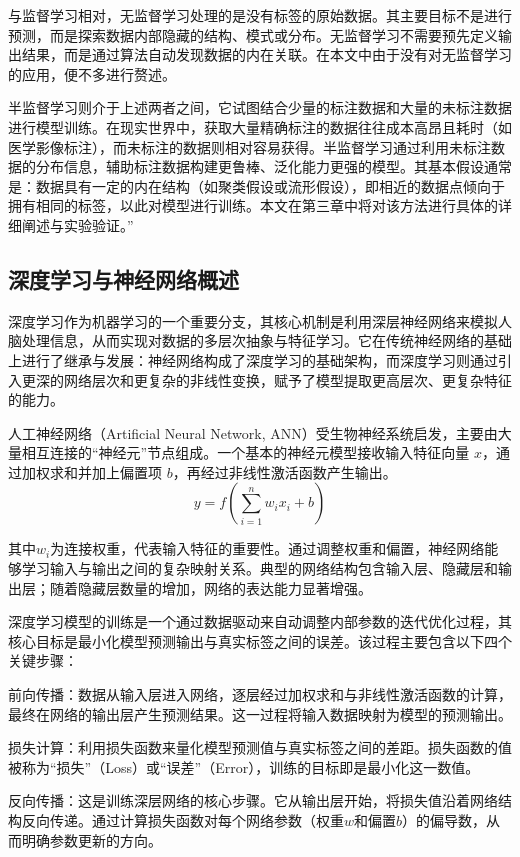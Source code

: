 \documentclass{xduugthesis}
\begin{document}
与监督学习相对，无监督学习处理的是没有标签的原始数据。其主要目标不是进行预测，而是探索数据内部隐藏的结构、模式或分布。无监督学习不需要预先定义输出结果，而是通过算法自动发现数据的内在关联。在本文中由于没有对无监督学习的应用，便不多进行赘述。

半监督学习则介于上述两者之间，它试图结合少量的标注数据和大量的未标注数据进行模型训练。在现实世界中，获取大量精确标注的数据往往成本高昂且耗时（如医学影像标注），而未标注的数据则相对容易获得。半监督学习通过利用未标注数据的分布信息，辅助标注数据构建更鲁棒、泛化能力更强的模型。其基本假设通常是：数据具有一定的内在结构（如聚类假设或流形假设），即相近的数据点倾向于拥有相同的标签，以此对模型进行训练。本文在第三章中将对该方法进行具体的详细阐述与实验验证。”

\subsection{深度学习与神经网络概述}
深度学习作为机器学习的一个重要分支，其核心机制是利用深层神经网络来模拟人脑处理信息，从而实现对数据的多层次抽象与特征学习。它在传统神经网络的基础上进行了继承与发展：神经网络构成了深度学习的基础架构，而深度学习则通过引入更深的网络层次和更复杂的非线性变换，赋予了模型提取更高层次、更复杂特征的能力。

人工神经网络（Artificial Neural Network, ANN）受生物神经系统启发，主要由大量相互连接的“神经元”节点组成。一个基本的神经元模型接收输入特征向量 $x$，通过加权求和并加上偏置项 $b$，再经过非线性激活函数产生输出。
\begin{equation}
    y = f\left( \sum_{i=1}^{n} w_i x_i + b \right)
\end{equation}

其中$w_i$为连接权重，代表输入特征的重要性。通过调整权重和偏置，神经网络能够学习输入与输出之间的复杂映射关系。典型的网络结构包含输入层、隐藏层和输出层；随着隐藏层数量的增加，网络的表达能力显著增强。

深度学习模型的训练是一个通过数据驱动来自动调整内部参数的迭代优化过程，其核心目标是最小化模型预测输出与真实标签之间的误差。该过程主要包含以下四个关键步骤：

前向传播：数据从输入层进入网络，逐层经过加权求和与非线性激活函数的计算，最终在网络的输出层产生预测结果。这一过程将输入数据映射为模型的预测输出。

损失计算：利用损失函数来量化模型预测值与真实标签之间的差距。损失函数的值被称为“损失”（Loss）或“误差”（Error），训练的目标即是最小化这一数值。

反向传播：这是训练深层网络的核心步骤。它从输出层开始，将损失值沿着网络结构反向传递。通过计算损失函数对每个网络参数（权重$w$和偏置$b$）的偏导数，从而明确参数更新的方向。
\end{document}
